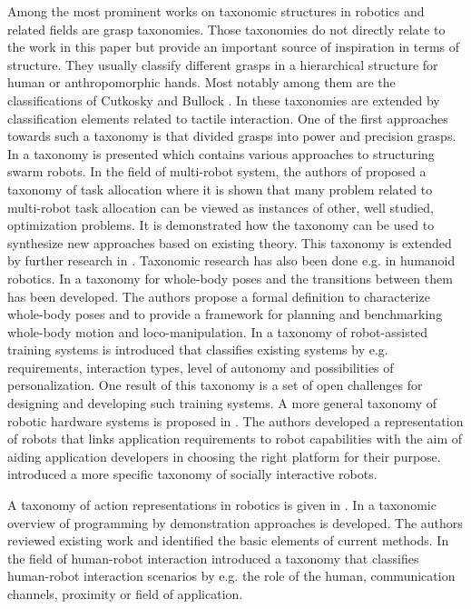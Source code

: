 Among the most prominent works on taxonomic structures in robotics and related fields are grasp taxonomies.
Those taxonomies do not directly relate to the work in this paper but provide an important source of inspiration in terms of structure.
They usually classify different grasps in a hierarchical structure for human or anthropomorphic hands.
Most notably among them are the classifications of Cutkosky \cite{Cutkosky.1989} and Bullock \cite{Bullock.2013}.
In \cite{Liu.2014} these taxonomies are extended by classification elements related to tactile interaction.
One of the first approaches towards such a taxonomy is \cite{Napier.1956} that divided grasps into power and precision grasps.
In \cite{Dudek.1993} a taxonomy is presented which contains various approaches to structuring swarm robots.
In the field of multi-robot system, the authors of \cite{Gerkey.2004} proposed a taxonomy of task allocation where it is shown that many problem related to multi-robot task allocation can be viewed as instances of other, well studied, optimization problems.
It is demonstrated how the taxonomy can be used to synthesize new approaches based on existing theory.
This taxonomy is extended by further research in \cite{Korsah.2013}.
Taxonomic research has also been done e.g. in humanoid robotics. In \cite{Borras.2015,Borras.2017} a taxonomy for whole-body poses and the transitions between them has been developed. The authors propose a formal definition to characterize whole-body poses and to provide a framework for planning and benchmarking whole-body motion and loco-manipulation.
In \cite{Tsiakas.2018} a taxonomy of robot-assisted training systems is introduced that classifies existing systems by e.g. requirements, interaction types, level of autonomy and possibilities of personalization.
One result of this taxonomy is a set of open challenges for designing and developing such training systems.
A more general taxonomy of robotic hardware systems is proposed in \cite{Linjawi.2018}.
The authors developed a representation of robots that links application requirements to robot capabilities with the aim of aiding application developers in choosing the right platform for their purpose.
\cite{Fong.2003} introduced a more specific taxonomy of socially interactive robots.

A taxonomy of action representations in robotics is given in \cite{Zech.2019}.
In \cite{BautistaBallester.2014} a taxonomic overview of programming by demonstration approaches is developed.
The authors reviewed existing work and identified the basic elements of current methods.
In the field of human-robot interaction \cite{Onnasch.2021} introduced a taxonomy that classifies human-robot interaction scenarios by e.g. the role of the human, communication channels, proximity or field of application.